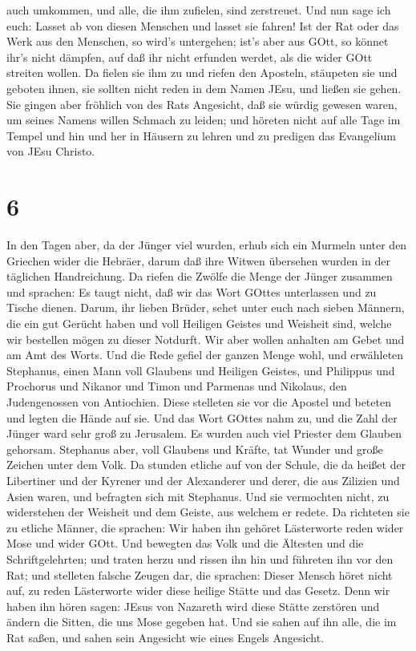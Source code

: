 auch umkommen, und alle, die ihm zufielen, sind zerstreuet.
 Und nun sage ich euch: Lasset ab von diesen Menschen und
lasset sie fahren! Ist der Rat oder das Werk aus den Menschen, so wird's
untergehen;  ist's aber aus GOtt, so könnet ihr's nicht
dämpfen, auf daß ihr nicht erfunden werdet, als die wider GOtt streiten
wollen.  Da fielen sie ihm zu und riefen den Aposteln,
stäupeten sie und geboten ihnen, sie sollten nicht reden in dem Namen
JEsu, und ließen sie gehen.  Sie gingen aber fröhlich von
des Rats Angesicht, daß sie würdig gewesen waren, um seines Namens
willen Schmach zu leiden;  und höreten nicht auf alle Tage
im Tempel und hin und her in Häusern zu lehren und zu predigen das
Evangelium von JEsu Christo.

\hypertarget{section-5}{%
\section{6}\label{section-5}}

 In den Tagen aber, da der Jünger viel wurden, erhub sich
ein Murmeln unter den Griechen wider die Hebräer, darum daß ihre Witwen
übersehen wurden in der täglichen Handreichung.  Da riefen
die Zwölfe die Menge der Jünger zusammen und sprachen: Es taugt nicht,
daß wir das Wort GOttes unterlassen und zu Tische dienen. 
Darum, ihr lieben Brüder, sehet unter euch nach sieben Männern, die ein
gut Gerücht haben und voll Heiligen Geistes und Weisheit sind, welche
wir bestellen mögen zu dieser Notdurft.  Wir aber wollen
anhalten am Gebet und am Amt des Worts.  Und die Rede gefiel
der ganzen Menge wohl, und erwähleten Stephanus, einen Mann voll
Glaubens und Heiligen Geistes, und Philippus und Prochorus und Nikanor
und Timon und Parmenas und Nikolaus, den Judengenossen von Antiochien.
 Diese stelleten sie vor die Apostel und beteten und legten
die Hände auf sie.  Und das Wort GOttes nahm zu, und die
Zahl der Jünger ward sehr groß zu Jerusalem. Es wurden auch viel
Priester dem Glauben gehorsam.  Stephanus aber, voll
Glaubens und Kräfte, tat Wunder und große Zeichen unter dem Volk.
 Da stunden etliche auf von der Schule, die da heißet der
Libertiner und der Kyrener und der Alexanderer und derer, die aus
Zilizien und Asien waren, und befragten sich mit Stephanus.
 Und sie vermochten nicht, zu widerstehen der Weisheit und
dem Geiste, aus welchem er redete.  Da richteten sie zu
etliche Männer, die sprachen: Wir haben ihn gehöret Lästerworte reden
wider Mose und wider GOtt.  Und bewegten das Volk und die
Ältesten und die Schriftgelehrten; und traten herzu und rissen ihn hin
und führeten ihn vor den Rat;  und stelleten falsche Zeugen
dar, die sprachen: Dieser Mensch höret nicht auf, zu reden Lästerworte
wider diese heilige Stätte und das Gesetz.  Denn wir haben
ihn hören sagen: JEsus von Nazareth wird diese Stätte zerstören und
ändern die Sitten, die uns Mose gegeben hat.  Und sie sahen
auf ihn alle, die im Rat saßen, und sahen sein Angesicht wie eines
Engels Angesicht.

